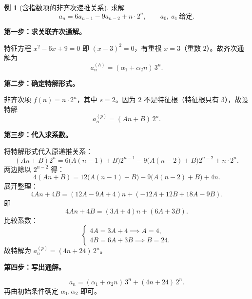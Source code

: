 \documentclass[UTF8,11pt,a4paper]{ctexbook}   %
\theoremstyle{definition}
\newtheorem{example}{例}[section]
\begin{document}
\begin{example}[含指数项的非齐次递推关系]
求解
\[
a_n = 6a_{n-1} - 9a_{n-2} + n\cdot 2^n,\qquad a_0,\ a_1\ \text{给定}.
\]

\textbf{第一步：求关联齐次通解。}

特征方程 $x^2 - 6x + 9 = 0$ 即 $(x-3)^2 = 0$，有重根 $x=3$（重数 $2$）。故齐次通解为
\[
a_n^{(h)} = (\alpha_1 + \alpha_2 n)\, 3^n.
\]

\textbf{第二步：确定特解形式。}

非齐次项 $f(n) = n\cdot 2^n$，其中 $s=2$。因为 $2$ 不是特征根（特征根只有 $3$），故设特解
\[
a_n^{(p)} = (An + B)\, 2^n.
\]

\textbf{第三步：代入求系数。}

将特解形式代入原递推关系：
\[
(An+B)2^n = 6\bigl(A(n-1)+B\bigr)2^{n-1} - 9\bigl(A(n-2)+B\bigr)2^{n-2} + n\cdot 2^n.
\]
两边除以 $2^{n-2}$ 得：
\[
4(An+B) = 12\bigl(A(n-1)+B\bigr) - 9\bigl(A(n-2)+B\bigr) + 4n.
\]
展开整理：
\[
4An + 4B = (12A - 9A + 4)n + (-12A + 12B + 18A - 9B).
\]
即
\[
4An + 4B = (3A + 4)n + (6A + 3B).
\]
比较系数：
\[
\begin{cases}
4A = 3A + 4 \implies A = 4,\\[0.3em]
4B = 6A + 3B \implies B = 24.
\end{cases}
\]
故特解为 $a_n^{(p)} = (4n + 24)\, 2^n$。

\textbf{第四步：写出通解。}

\[
a_n = (\alpha_1 + \alpha_2 n)\, 3^n + (4n + 24)\, 2^n.
\]
再由初始条件确定 $\alpha_1,\alpha_2$ 即可。
\end{example}
\end{document}
